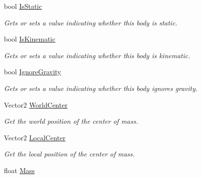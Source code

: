 \begin{DoxyCompactItemize}
bool \hyperlink{class_farseer_physics_1_1_dynamics_1_1_body_aa477c409660db90246adfdc07f4fede1}{Is\+Static}
\begin{DoxyCompactList}\small\item\em Gets or sets a value indicating whether this body is static. \end{DoxyCompactList}\item 
bool \hyperlink{class_farseer_physics_1_1_dynamics_1_1_body_a4488451c0dff0c328d772032ff776f31}{Is\+Kinematic}
\begin{DoxyCompactList}\small\item\em Gets or sets a value indicating whether this body is kinematic. \end{DoxyCompactList}\item 
bool \hyperlink{class_farseer_physics_1_1_dynamics_1_1_body_ad83498f3542a081b6dbaba625d4c8720}{Ignore\+Gravity}
\begin{DoxyCompactList}\small\item\em Gets or sets a value indicating whether this body ignores gravity. \end{DoxyCompactList}\item 
Vector2 \hyperlink{class_farseer_physics_1_1_dynamics_1_1_body_a2f7cd7e7b79a7710cf9f7141ba2e8466}{World\+Center}
\begin{DoxyCompactList}\small\item\em Get the world position of the center of mass. \end{DoxyCompactList}\item 
Vector2 \hyperlink{class_farseer_physics_1_1_dynamics_1_1_body_a203f73f859e1a9fc0148fd55a839ec20}{Local\+Center}
\begin{DoxyCompactList}\small\item\em Get the local position of the center of mass. \end{DoxyCompactList}\item 
float \hyperlink{class_farseer_physics_1_1_dynamics_1_1_body_a1856ecffe4c463466a6ff9ca1803f664}{Mass}

\end{DoxyCompactItemize}

